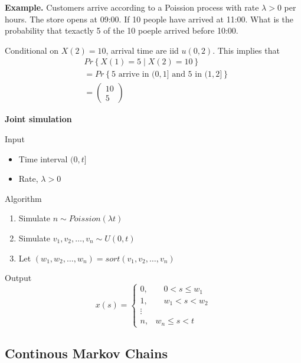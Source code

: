 \documentclass{article}
\theoremstyle{remark}
\newcommand{\newpara}
  {
  \vskip 0.4cm
  }
\begin{document}
\begin{tcolorbox}
  \textbf{Example.} Customers arrive according to a Poission process with rate $\lambda  > 0$ per hours.  The store opens at 09:00. If 10 people have arrived at 11:00. What is the probability that texactly 5 of the 10 poeple arrived before 10:00.

  \newpara
  Conditional on $X\left( 2 \right) = 10$, arrival time are iid  $u\left( 0,2 \right)$. This implies that \[
    \begin{split}
     &  Pr \left \{ X\left( 1 \right)   = 5  \mid  X\left( 2 \right) = 10 \right \}  \\
   & = Pr \left \{ 5 \text{ arrive in } (0, 1] \text{ and }5 \text{ in } (1,2] \right \}  \\
   &= \begin{pmatrix}
   10 \\
   5
   \end{pmatrix}
    \end{split}
  \]
\end{tcolorbox}

\textbf{Joint simulation}

\newpara
Input
\begin{itemize}
  \item Time interval $(0, t]$
  \item Rate,  $\lambda  > 0$
\end{itemize}

Algorithm
\begin{enumerate}[label=(\roman*)]
  \item Simulate $n \sim Poission \left( \lambda t \right)$
  \item Simulate $v_{1} , v_{2} , \ldots , v_{n} \sim U\left( 0,t \right)$
  \item Let $\left( w_{1}, w_{2}, \ldots, w_{n} \right) = sort \left( v_{1}, v_{2}, \ldots, v_{n} \right)$
\end{enumerate}

Output \[
  x\left( s \right) =
\begin{cases}
  0, &  \quad  0< s \le w_{1}  \\
  1,  &  \quad w_{1} < s < w_{2} \\
  \vdots   &  \\
  n, &   w_{n} \le s < t
\end{cases}
\]


\subsection{Continous Markov Chains}%
\label{sub:continous_markov_chains}
\end{document}
